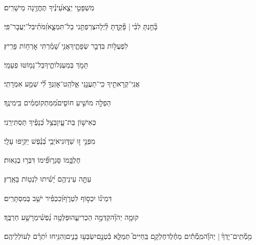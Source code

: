 \documentclass[12pt]{article}
\newcommand{\loc}[1]{\textsuperscript{\locf{#1}}}
\begin{document}
{\loc{ ב}~}‏ מִשְׁפָּטִ֣י יֵצֵ֑א{\hfill}עֵ֝ינֶ֗יךָ תֶּחֱזֶ֥ינָה מֵישָׁרִֽים׃\par

{\loc{ ג}~}‏בָּ֘חַ֤נְתָּ לִבִּ֨י |  פָּ֘קַ֤דְתָּ לַּ֗יְלָה{\hfill}צְרַפְתַּ֥נִי בַל־תִּמְצָ֑א\newline\hspace*{.5em}זַ֝מֹּתִ֗י{\hfill}בַּל־יַעֲבׇר־פִּֽי׃\par

{\loc{ ד}~}‏לִפְעֻלּ֣וֹת  בִּדְבַ֣ר שְׂפָתֶ֑יךָ{\hfill}אֲנִ֥י שָׁ֝מַ֗רְתִּי אׇרְח֥וֹת פָּרִֽיץ׃\par

{\loc{ ה}~}‏תָּמֹ֣ךְ  בְּמַעְגְּלוֹתֶ֑יךָ{\hfill}בַּל־נָמ֥וֹטּוּ פְעָמָֽי׃\par

{\loc{ ו}~}‏אֲנִֽי־קְרָאתִ֣יךָ כִֽי־תַעֲנֵ֣נִי אֵ֑ל{\hfill}הַֽט־אׇזְנְךָ֥ לִ֝֗י שְׁמַ֣ע אִמְרָתִֽי׃\par

{\loc{ ז}~}‏הַפְלֵ֣ה  מוֹשִׁ֣יעַ חוֹסִ֑ים{\hfill}מִ֝מִּתְקוֹמְמִ֗ים בִּֽימִינֶֽךָ׃\par

{\loc{ ח}~}‏ כְּאִישׁ֣וֹן בַּת־עָ֑יִן{\hfill}בְּצֵ֥ל כְּ֝נָפֶ֗יךָ תַּסְתִּירֵֽנִי׃\par

{\loc{ ט}~}‏מִפְּנֵ֣י  ז֣וּ שַׁדּ֑וּנִי{\hfill}אֹיְבַ֥י בְּ֝נֶ֗פֶשׁ יַקִּ֥יפוּ עָלָֽי׃\par

{\loc{ י}~}‏חֶלְבָּ֥מוֹ סָּגְר֑וּ{\hfill}פִּ֝֗ימוֹ דִּבְּר֥וּ בְגֵאֽוּת׃\par

{\loc{ יא}~}‏ עַתָּ֣ה {\hfill}עֵינֵיהֶ֥ם יָ֝שִׁ֗יתוּ לִנְט֥וֹת בָּאָֽרֶץ׃\par

{\loc{ יב}~}‏דִּמְיֹנ֗וֹ  יִכְס֣וֹף לִטְרֹ֑ף{\hfill}וְ֝כִכְפִ֗יר יֹשֵׁ֥ב בְּמִסְתָּרִֽים׃\par

{\loc{ יג}~}‏קוּמָ֤ה יְהֹוָ֗ה{\hfill}קַדְּמָ֣ה  הַכְרִיעֵ֑הוּ\newline\hspace*{.5em}פַּלְּטָ֥ה נַ֝פְשִׁ֗י{\hfill}מֵרָשָׁ֥ע חַרְבֶּֽךָ׃\par

{\loc{ יד}~}‏מִ֥מְﬞתִֽים־יָדְךָ֨ |  יְהֹוָ֡ה{\hfill}מִֽמְﬞתִ֬ים מֵחֶ֗לֶד\newline\hspace*{.5em}חֶלְקָ֥ם בַּֽחַיִּים֮{\hfill} תְּמַלֵּ֢א בִ֫טְנָ֥ם\newline\hspace*{.5em}יִשְׂבְּע֥וּ בָנִ֑ים{\hfill}וְהִנִּ֥יחוּ יִ֝תְרָ֗ם לְעוֹלְלֵיהֶֽם׃\par
\end{document}
